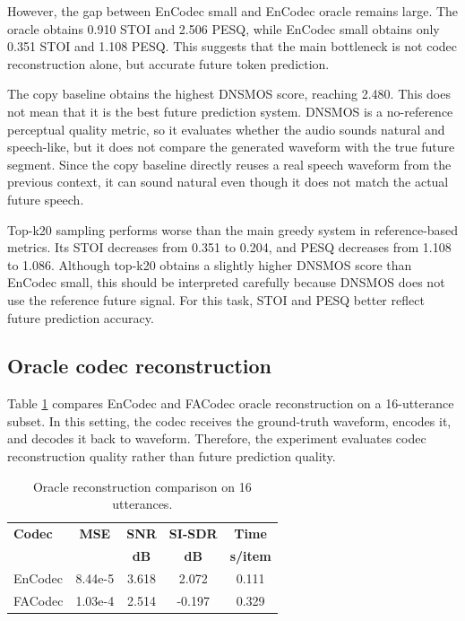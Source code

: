 \documentclass{article}
\begin{document}
	However, the gap between EnCodec small and EnCodec oracle remains large. The oracle obtains 0.910 STOI and 2.506 PESQ, while EnCodec small obtains only 0.351 STOI and 1.108 PESQ. This suggests that the main bottleneck is not codec reconstruction alone, but accurate future token prediction.
	
	The copy baseline obtains the highest DNSMOS score, reaching 2.480. This does not mean that it is the best future prediction system. DNSMOS is a no-reference perceptual quality metric, so it evaluates whether the audio sounds natural and speech-like, but it does not compare the generated waveform with the true future segment. Since the copy baseline directly reuses a real speech waveform from the previous context, it can sound natural even though it does not match the actual future speech.
	
	Top-k20 sampling performs worse than the main greedy system in reference-based metrics. Its STOI decreases from 0.351 to 0.204, and PESQ decreases from 1.108 to 1.086. Although top-k20 obtains a slightly higher DNSMOS score than EnCodec small, this should be interpreted carefully because DNSMOS does not use the reference future signal. For this task, STOI and PESQ better reflect future prediction accuracy.
	
	\subsection{Oracle codec reconstruction}
	
	Table \ref{tab:oracle} compares EnCodec and FACodec oracle reconstruction on a 16-utterance subset. In this setting, the codec receives the ground-truth waveform, encodes it, and decodes it back to waveform. Therefore, the experiment evaluates codec reconstruction quality rather than future prediction quality.
	
	\begin{table}[t]
		\centering
		\caption{Oracle reconstruction comparison on 16 utterances.}
		\label{tab:oracle}
		\small
		\begin{tabular}{lcccc}
			\toprule
			\textbf{Codec} & \textbf{MSE} & \textbf{SNR} & \textbf{SI-SDR} & \textbf{Time} \\
			& & \textbf{dB} & \textbf{dB} & \textbf{s/item} \\
			\midrule
			EnCodec & 8.44e-5 & 3.618 & 2.072 & 0.111 \\
			FACodec & 1.03e-4 & 2.514 & -0.197 & 0.329 \\
			\bottomrule
		\end{tabular}
	\end{table}
	
\end{document}
